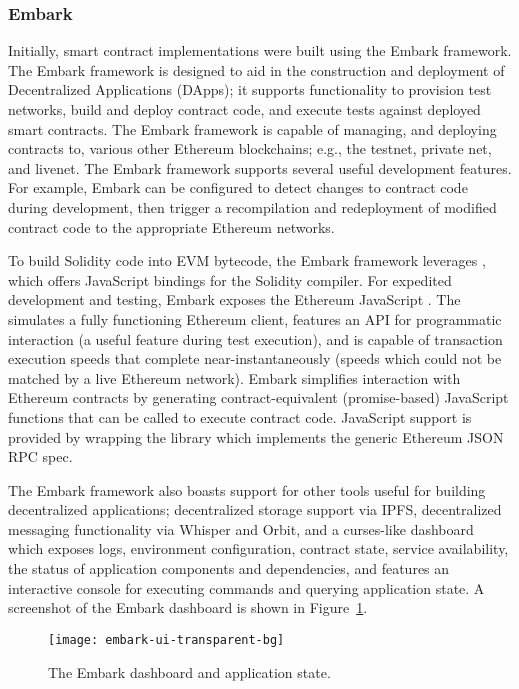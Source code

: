 \subsubsection{Embark}
Initially, smart contract implementations were built using the Embark framework.
The Embark framework is designed to aid in the construction and deployment of
Decentralized Applications (DApps); it supports functionality to provision test
networks, build and deploy contract code, and execute tests against deployed
smart contracts. The Embark framework is capable of managing, and deploying
contracts to, various other Ethereum blockchains; e.g., the testnet, private
net, and livenet. The Embark framework supports several useful development
features. For example, Embark can be configured to detect changes to contract
code during development, then trigger a recompilation and redeployment of
modified contract code to the appropriate Ethereum networks.

To build Solidity code into EVM bytecode, the Embark framework leverages
, which offers JavaScript bindings for the Solidity compiler. For
expedited development and testing, Embark exposes the Ethereum JavaScript
. The  simulates a fully functioning Ethereum
client, features an API for programmatic interaction (a useful feature during
test execution), and is capable of transaction execution speeds that complete
near-instantaneously (speeds which could not be matched by a live Ethereum
network). Embark simplifies interaction with Ethereum contracts by generating
contract-equivalent (promise-based) JavaScript functions that can be called to
execute contract code. JavaScript support is provided by wrapping the
 library which implements the generic Ethereum JSON RPC spec.

The Embark framework also boasts support for other tools useful for building
decentralized applications; decentralized storage support via IPFS,
decentralized messaging functionality via Whisper and Orbit, and a curses-like
dashboard which exposes logs, environment configuration, contract state, service
availability, the status of application components and dependencies, and
features an interactive console for executing commands and querying application
state. A screenshot of the Embark dashboard is shown in
Figure~\ref{fig:embark-dashboard}.

\begin{figure}[H]
  \centering
  \texttt{[image: embark-ui-transparent-bg]}
  \caption{The Embark dashboard and application state.}\label{fig:embark-dashboard}
\end{figure}


